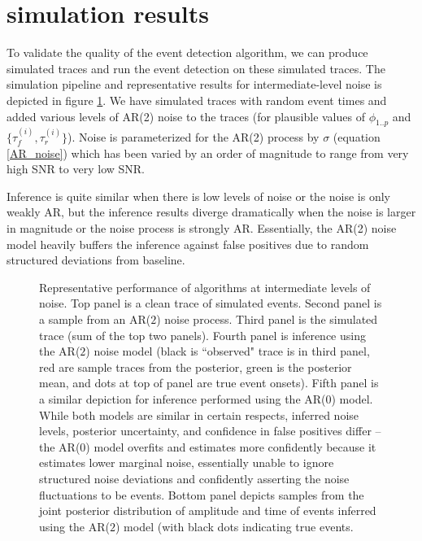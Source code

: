\documentclass{article}
\begin{document}
\section*{simulation results}

To validate the quality of the event detection algorithm, we can produce simulated traces and run the event detection on these simulated traces.  The simulation pipeline and representative results for intermediate-level noise is depicted in figure \ref{fig:sim_traces}. We have simulated traces with random event times and added various levels of AR(2) noise to the traces (for plausible values of $\phi_{1..p}$ and $\{\tau_f^{(i)},\tau_r^{(i)}\}$). Noise is parameterized for the AR(2) process by $\sigma$ (equation \ref{AR_noise}) which has been varied by an order of magnitude to range from very high SNR to very low SNR.  

Inference is quite similar when there is low levels of noise or the noise is only weakly AR, but the inference results diverge dramatically when the noise is larger in magnitude or the noise process is strongly AR.  Essentially, the AR(2) noise model heavily buffers the inference against false positives due to random structured deviations from baseline.

\begin{figure}[H]
\begin{center}
  \end{center}    
  \captionsetup{width=.7\textwidth}
\caption{Representative performance of algorithms at intermediate levels of noise.  Top panel is a clean trace of simulated events.  Second panel is a sample from an AR($2$) noise process.  Third panel is the simulated trace (sum of the top two panels). Fourth panel is inference using the AR($2$) noise model (black is ``observed" trace is in third panel, red are sample traces from the posterior, green is the posterior mean, and dots at top of panel are true event onsets). Fifth panel is a similar depiction for inference performed using the AR($0$) model.  While both models are similar in certain respects, inferred noise levels, posterior uncertainty, and confidence in false positives differ -- the AR($0$) model overfits and estimates more confidently because it estimates lower marginal noise, essentially unable to ignore structured noise deviations and confidently asserting the noise fluctuations to be events.  Bottom panel depicts samples from the joint posterior distribution of amplitude and time of events inferred using the AR($2$) model (with black dots indicating true events.}
\label{fig:sim_traces}
\end{figure}
\end{document}
